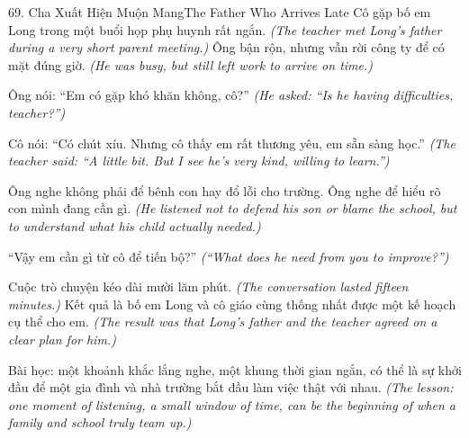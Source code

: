 \begin{truyen}{69. Cha Xuất Hiện Muộn Mang}{The Father Who Arrives Late}
Cô gặp bố em Long trong một buổi họp phụ huynh rất ngắn.
\textit{(The teacher met Long's father during a very short parent meeting.)}
Ông bận rộn, nhưng vẫn rời công ty để có mặt đúng giờ.
\textit{(He was busy, but still left work to arrive on time.)}

Ông nói: ``Em có gặp khó khăn không, cô?''
\textit{(He asked: ``Is he having difficulties, teacher?'')}

Cô nói: ``Có chút xíu. Nhưng cô thấy em rất thương yêu, em sẵn sàng học.''
\textit{(The teacher said: ``A little bit. But I see he's very kind, willing to learn.'')}

Ông nghe không phải để bênh con hay đổ lỗi cho trường. Ông nghe để hiểu rõ con mình đang cần gì.
\textit{(He listened not to defend his son or blame the school, but to understand what his child actually needed.)}

``Vậy em cần gì từ cô để tiến bộ?''
\textit{(``What does he need from you to improve?'')}

Cuộc trò chuyện kéo dài mười lăm phút.
\textit{(The conversation lasted fifteen minutes.)}
Kết quả là bố em Long và cô giáo cùng thống nhất được một kế hoạch cụ thể cho em.
\textit{(The result was that Long's father and the teacher agreed on a clear plan for him.)}

Bài học: một khoảnh khắc lắng nghe, một khung thời gian ngắn, có thể là sự khởi đầu để một gia đình và nhà trường bắt đầu làm việc thật với nhau.
\textit{(The lesson: one moment of listening, a small window of time, can be the beginning of when a family and school truly team up.)}
\end{truyen}

